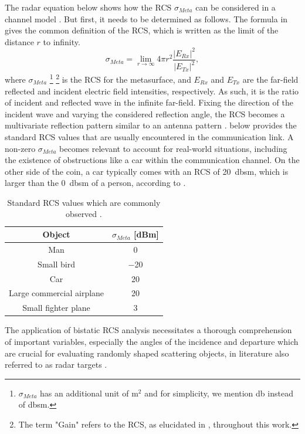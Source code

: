 The radar equation below shows how the RCS $\sigma_{Meta}$ can be considered in a channel model \cite{RCS1}. But first, it needs to be determined as follows. The formula in  gives the common definition of the RCS, which is written as the limit of the distance $r$ to infinity.
\begin{equation} \label{Eq:RCS_rtendsto inf}
	\sigma_{Meta}= \lim_{r\to\infty} 4 \pi r^2 \frac{|E_{Rx}|^2}{|E_{Tx}|^2} ,
\end{equation}
where $\sigma_{Meta}$ \footnote{$\sigma_{Meta}$ has an additional unit of $\si{\meter}^2$ and for simplicity, we mention \si{\decibel} instead of \si{\decibel}sm.} \footnote{The term "Gain" refers to the RCS, as elucidated in , throughout this work.} is the RCS for the metasurface, and $E_{Rx}$ and $E_{Tx}$ are the far-field reflected and incident electric field intensities, respectively. As such, it is the ratio of incident and reflected wave in the infinite far-field. Fixing the direction of the incident wave and varying the considered reflection angle, the RCS becomes a multivariate reflection pattern similar to an antenna pattern \cite{RCS_1, RCS_2}.  below provides the standard RCS values that are usually encountered in the communication link. A non-zero $\sigma_{Meta}$ becomes relevant to account for real-world situations, including the existence of obstructions like a car within the communication channel. On the other side of the coin, a car typically comes with an RCS of \SI{20}{\decibel}sm, which is larger than the \SI{0}{\decibel}sm of a person, according to .

\begin{table}[tb] %
	\caption{Standard RCS values which are commonly observed \cite{RCS_meta, RCS_meta2}.}
	\footnotesize
	\label{Table:standard_sigma_values}
	\centering
	\begin{tabular}{c|c}
		\textbf{Object} & \textbf{$\sigma_{Meta}$ [dBm]} \\
		\hline
		Man & \num{0}\\
		\hline
		Small bird & \num{-20}\\
		\hline
		Car & \num{20}\\
		\hline
		Large commercial airplane  & \num{20}\\
		\hline
		Small fighter plane  & \num{3}\\
	\end{tabular}
\end{table}
The application of bistatic RCS analysis necessitates a thorough comprehension of important variables, especially the angles of the incidence and departure which are crucial for evaluating randomly shaped scattering objects, in literature also referred to as radar targets \cite{Balanis, RCS2}.

